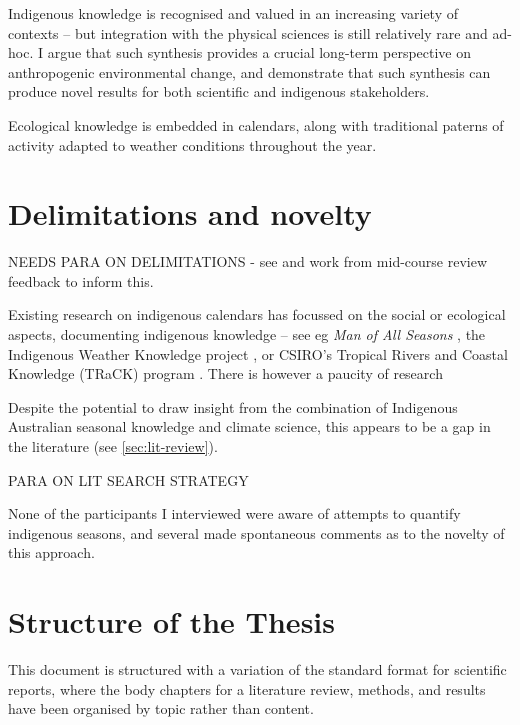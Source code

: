 Indigenous knowledge is recognised and valued in an increasing variety of contexts
\citep[eg.][]{petheram2011,cochran2015,berkes2008} –
but integration with the physical sciences is still relatively rare and ad-hoc.
%
I argue that such synthesis provides a crucial long-term perspective on
anthropogenic environmental change, and demonstrate that such synthesis can produce novel
results for both scientific and indigenous stakeholders.



Ecological knowledge is embedded in calendars, along with traditional paterns of activity adapted to weather conditions throughout the year.









\section{Delimitations and novelty}

NEEDS PARA ON DELIMITATIONS - see and work from mid-course review feedback to inform this.


Existing research on indigenous calendars has focussed on the social or ecological aspects,
documenting indigenous knowledge – see eg \textit{Man of All Seasons} \citep{davis1989},
the Indigenous Weather Knowledge project \citet{BOM-iwk},
or CSIRO’s Tropical Rivers and Coastal Knowledge (TRaCK) program \citep{CSIROcals,oconnor2010}.
There is however a paucity of research 

Despite the potential to draw insight from the combination of Indigenous Australian seasonal knowledge and climate science, this appears to be a gap in the literature (see \autoref{sec:lit-review}).

PARA ON LIT SEARCH STRATEGY

None of the participants I interviewed were aware of attempts to quantify indigenous seasons,
and several made spontaneous comments as to the novelty of this approach.





\section{Structure of the Thesis}

This document is structured with a variation of the standard format for scientific reports,
where the body chapters for a literature review, methods, and results
have been organised by topic rather than content.

